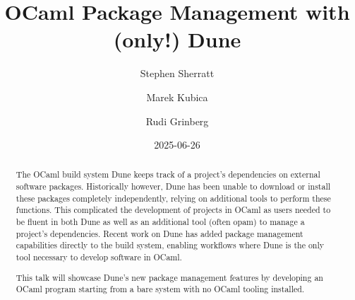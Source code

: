 \documentclass{article}
\title{\bf OCaml Package Management with (only!) Dune}
\date{2025-06-26}
\author[1]{Stephen Sherratt}
\author[1]{Marek Kubica}
\author[ ]{Rudi Grinberg}
\affil[1]{Tarides}
\begin{document}
    \maketitle

    \begin{abstract}
        The OCaml build system Dune keeps track of a project's dependencies on
        external software packages. Historically however, Dune has been unable
        to download or install these packages completely independently, relying
        on additional tools to perform these functions. This complicated the
        development of projects in OCaml as users needed to be fluent in both
        Dune as well as an additional tool (often opam) to manage a project's
        dependencies. Recent work on Dune has added package management
        capabilities directly to the build system, enabling workflows where Dune
        is the only tool necessary to develop software in OCaml.

        This talk will showcase Dune's new package management features by
        developing an OCaml program starting from a bare system with no OCaml
        tooling installed.
    \end{abstract}
\end{document}
